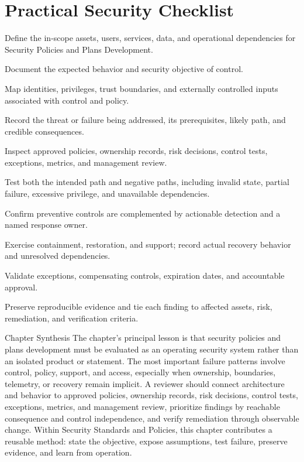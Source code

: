 \documentclass[11pt,letterpaper]{article}
\begin{document}
\section*{Practical Security Checklist}
\begin{CornellChecklist}
\item Define the in-scope assets, users, services, data, and operational dependencies for Security Policies and Plans Development.
\item Document the expected behavior and security objective of control.
\item Map identities, privileges, trust boundaries, and externally controlled inputs associated with control and policy.
\item Record the threat or failure being addressed, its prerequisites, likely path, and credible consequences.
\item Inspect approved policies, ownership records, risk decisions, control tests, exceptions, metrics, and management review.
\item Test both the intended path and negative paths, including invalid state, partial failure, excessive privilege, and unavailable dependencies.
\item Confirm preventive controls are complemented by actionable detection and a named response owner.
\item Exercise containment, restoration, and support; record actual recovery behavior and unresolved dependencies.
\item Validate exceptions, compensating controls, expiration dates, and accountable approval.
\item Preserve reproducible evidence and tie each finding to affected assets, risk, remediation, and verification criteria.
\end{CornellChecklist}
\begin{CornellSummaryBox}{Chapter Synthesis}
The chapter's principal lesson is that security policies and plans development must be evaluated as an operating security system rather than an isolated product or statement. The most important failure patterns involve control, policy, support, and access, especially when ownership, boundaries, telemetry, or recovery remain implicit. A reviewer should connect architecture and behavior to approved policies, ownership records, risk decisions, control tests, exceptions, metrics, and management review, prioritize findings by reachable consequence and control independence, and verify remediation through observable change. Within Security Standards and Policies, this chapter contributes a reusable method: state the objective, expose assumptions, test failure, preserve evidence, and learn from operation.
\end{CornellSummaryBox}
\end{document}
